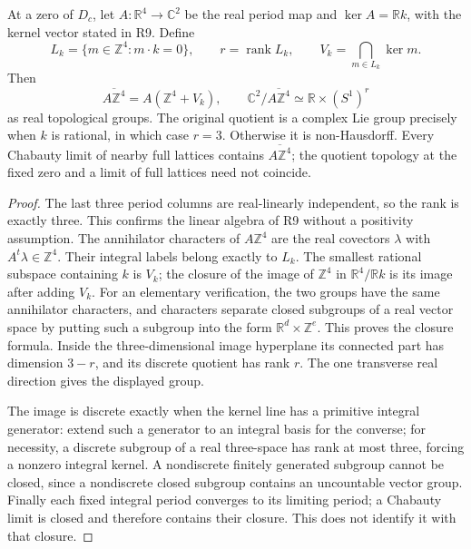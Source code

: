 \begin{proposition}[D.4.3; Proved]
At a zero of \(D_c\), let \(A:\mathbb R^4\to\mathbb C^2\) be
the real period map and \(\ker A=\mathbb R k\), with the kernel
vector stated in R9. Define
\[
 L_k=\{m\in\mathbb Z^4:m\cdot k=0\},\qquad r=\operatorname{rank}L_k,
 \qquad V_k=\bigcap_{m\in L_k}\ker m.
\]
Then
\[
 \overline{A\mathbb Z^4}=A(\mathbb Z^4+V_k),\qquad
 \mathbb C^2/\overline{A\mathbb Z^4}\simeq
                         \mathbb R\times(S^1)^r
\]
as real topological groups. The original quotient is a complex Lie
group precisely when \(k\) is rational, in which case \(r=3\).
Otherwise it is non-Hausdorff. Every Chabauty limit of nearby full
lattices contains \(\overline{A\mathbb Z^4}\); the quotient topology
at the fixed zero and a limit of full lattices need not coincide.
\end{proposition}
\begin{proof}
The last three period columns are real-linearly independent, so the
rank is exactly three. This confirms the linear algebra of R9
without a positivity assumption. The annihilator characters of
\(A\mathbb Z^4\) are the real covectors \(\lambda\) with
\(A^t\lambda\in\mathbb Z^4\). Their integral labels belong exactly
to \(L_k\). The smallest rational subspace containing \(k\) is
\(V_k\); the closure of the image of \(\mathbb Z^4\) in
\(\mathbb R^4/\mathbb R k\) is its image after adding \(V_k\).
For an elementary verification, the two groups have the same
annihilator characters, and characters separate closed subgroups of
a real vector space by putting such a subgroup into the form
\(\mathbb R^d\times\mathbb Z^e\). This proves the closure formula.
Inside the three-dimensional image hyperplane its connected part
has dimension \(3-r\), and its discrete quotient has rank \(r\).
The one transverse real direction gives the displayed group.

The image is discrete exactly when the kernel line has a primitive
integral generator: extend such a generator to an integral basis for
the converse; for necessity, a discrete subgroup of a real
three-space has rank at most three, forcing a nonzero integral
kernel. A nondiscrete finitely generated subgroup cannot be closed,
since a nondiscrete closed subgroup contains an uncountable vector
group. Finally each fixed integral period converges to its limiting
period; a Chabauty limit is closed and therefore contains their
closure. This does not identify it with that closure.
\end{proof}


